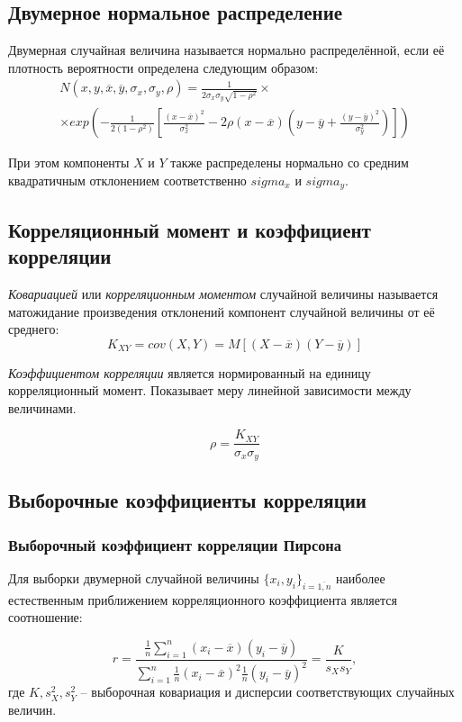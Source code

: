\subsection{Двумерное нормальное распределение}

Двумерная случайная величина называется нормально распределённой, если её плотность вероятности определена следующим образом:
\begin{multline}
	N(x, y, \overline{x}, \overline{y}, \sigma_x, \sigma_y, \rho) =
	\frac{1}{2 \sigma_x \sigma_y \sqrt{1 - \rho^2}} \times \\	
	\times exp \left( - \frac{1}{2(1 - \rho^2)} \left[ \frac{(x - \overline{x})^2}{\sigma_x^2} - 2 \rho (x - \overline{x}) (y - \overline{y} + \frac{(y - \overline{y})^2}{\sigma_y^2}) \right] \right) 
\end{multline}

При этом компоненты $X$ и $Y$ также распределены нормально со средним квадратичным отклонением соответственно $sigma_x$ и $sigma_y$.

\subsection{Корреляционный момент и коэффициент корреляции}

\textit{Ковариацией} или \textit{корреляционным моментом} случайной величины называется матожидание произведения отклонений компонент случайной величины от её среднего:
\begin{equation}
	K_{XY} = cov(X, Y) = M[(X - \overline{x})(Y - \overline{y})]
\end{equation}

\textit{Коэффициентом корреляции} является нормированный на единицу корреляционный момент. Показывает меру линейной зависимости между величинами.

\begin{equation}
	\rho = \frac{K_{XY}}{\sigma_x \sigma_y}
\end{equation}

\subsection{Выборочные коэффициенты корреляции}
\subsubsection{Выборочный коэффициент корреляции Пирсона}

Для выборки двумерной случайной величины $\{x_i, y_i\}_{i=\overline{1,n}}$ наиболее естественным приближением корреляционного коэффициента является соотношение:

\begin{equation}
	r = \frac{\frac{1}{n} \displaystyle \sum_{i=1}^{n}{\left(x_i - \overline{x}\right)\left(y_i - \overline{y}\right)}}{\displaystyle \sum_{i=1}^{n}{\frac{1}{n}\left(x_i - \overline{x}\right)^2\frac{1}{n}\left(y_i - \overline{y}\right)^2}} = \frac{K}{s_X s_Y},
\end{equation}
где $K, s_X^2, s_Y^2$ -- выборочная ковариация и дисперсии соответствующих случайных величин.
